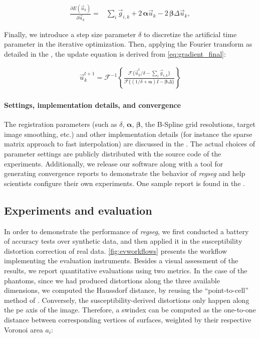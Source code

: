   \begin{align}
  \frac{\partial E(\vec{u}_k)}{\partial \vec{u}_k} =
  &\underset{i}{\sum} \vec{g}_{i,k} +2\, \boldsymbol{\alpha} \vec{u}_k
  -2\, \boldsymbol{\beta} \Delta \vec{u}_k,
  \label{eq:gradient_final}
  \end{align}

Finally, we introduce a step size parameter $\delta$ to discretize the artificial time parameter
  in the iterative optimization.
Then, applying the Fourier transform as detailed in the , the
  update equation is derived from \eqref{eq:gradient_final}:

  \begin{align}
  \vec{u}_k^{t+1} = \mathcal{F}^{-1}\left\{ \frac{\mathcal{F}\{\vec{u}_k^t / \delta - \sum_i \vec{g}_{i,k}\}}%
                  {\mathcal{F}\{(1/\delta+\boldsymbol{\alpha})I-\boldsymbol{\beta}\Delta\}} \right\}
  \label{eq:update_equation}
  \end{align}


\paragraph*{Settings, implementation details, and convergence}
\label{sec:conv_report}
The registration parameters (such as $\delta$, $\boldsymbol{\alpha}$, $\boldsymbol{\beta}$,
  the B-Spline grid resolutions, target image smoothing, etc.)
  and other implementation details (for instance the sparse matrix approach
  to fast interpolation) are discussed in the .
The actual choices of parameter settings are publicly distributed with the source code of the experiments.
Additionally, we release our software along with a tool for generating convergence reports to
  demonstrate the behavior of \emph{regseg} and help scientists configure their own experiments.
One sample report is found in the .


\subsection{Experiments and evaluation}
\label{sec:experiments_evaluation}
%
In order to demonstrate the performance of \emph{regseg}, we first conducted a battery of
  accuracy tests over synthetic data, and then applied it in the susceptibility distortion
  correction of real data.
\autoref{fig:evworkflows} presents the workflow implementing the evaluation instruments.
Besides a visual assessment of the results, we report quantitative evaluations using
  two metrics.
In the case of the phantoms, since we had produced distortions along the three
  available dimensions, we computed the Haussdorf distance, by reusing the
  ``point-to-cell'' method of \cite{commandeur_vtk_2011}.
Conversely, the susceptibility-derived distortions only happen along the \gls*{pe}
  axis of the image.
Therefore, a \gls*{swindex} can be computed as the one-to-one distance between corresponding
  vertices of surfaces, weighted by their respective Voronoi area $a_i$:

